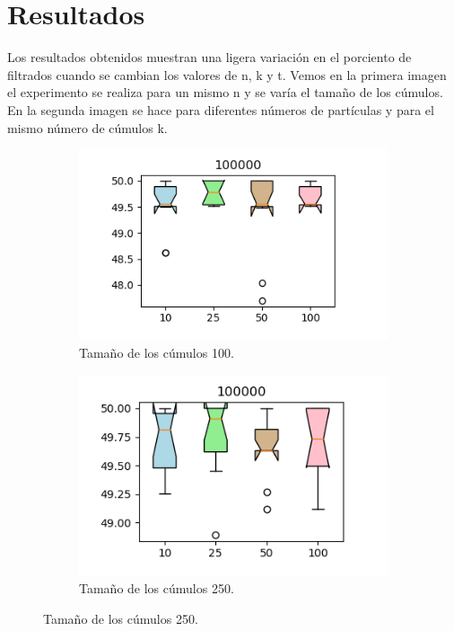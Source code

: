 \documentclass{article}
\begin{document}
\section{Resultados}
Los resultados obtenidos muestran una ligera variación en el porciento de filtrados cuando se cambian los valores de n, k y t. Vemos en la primera imagen el experimento se realiza para un mismo n y se varía el tamaño de los cúmulos. En la segunda imagen se hace para diferentes números de partículas y para el mismo número de cúmulos k.

\begin{figure}[H]
	\centering
	\begin{subfigure}[b]{0.45\linewidth}
		\includegraphics[width=\linewidth]{c100.png}
		\caption{Tamaño de los cúmulos 100.}
		\label{1}
	\end{subfigure}
		\begin{subfigure}[b]{0.45\linewidth}
		\includegraphics[width=\linewidth]{c250.png}
		\caption{Tamaño de los cúmulos 250.}

\end{subfigure}
\end{figure}
\end{document}
